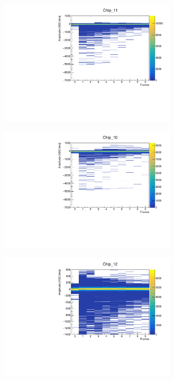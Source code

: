 \documentclass[12pt]{article}
\begin{document}
\begin{figure}[H]
\begin{subfigure}[b]{0.45\textwidth}
	\centering
	\includegraphics[width=\textwidth]{Chip_11_A2fr_hist}
\end{subfigure}
\begin{subfigure}[b]{0.45\textwidth}
	\centering
	\includegraphics[width=\textwidth]{Chip_10_A2fr_hist}
\end{subfigure}
\begin{subfigure}[b]{0.45\textwidth}
	\centering
	\includegraphics[width=\textwidth]{Chip_12_A2fr_hist}

\end{subfigure}
\end{figure}
\end{document}
